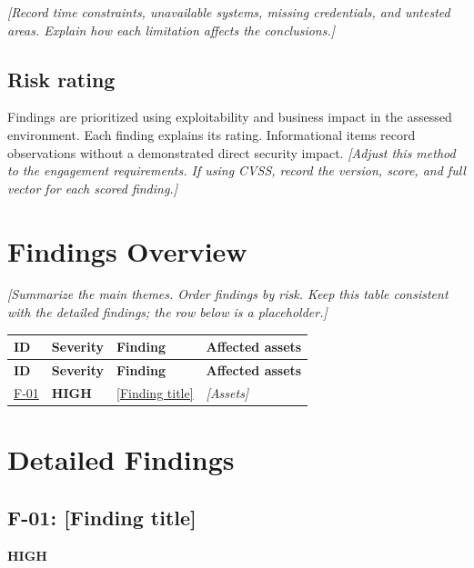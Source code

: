 \documentclass[11pt,letterpaper]{article}
\newcommand{\prompt}[1]{\textit{\textcolor{muted}{[#1]}}}
\newcommand{\severity}[1]{\textbf{\textcolor{#1}{\MakeUppercase{#1}}}}
\newcommand{\finding}[4]{%
  \clearpage
  \subsection{#1: #2}\label{#4}
  \severity{#3}\par
}
\begin{document}
\prompt{Record time constraints, unavailable systems, missing credentials,
and untested areas. Explain how each limitation affects the conclusions.}

\subsection{Risk rating}
Findings are prioritized using exploitability and business impact in the
assessed environment. Each finding explains its rating. Informational items
record observations without a demonstrated direct security impact.
\prompt{Adjust this method to the engagement requirements. If using CVSS,
record the version, score, and full vector for each scored finding.}

\clearpage
\section{Findings Overview}
\prompt{Summarize the main themes. Order findings by risk. Keep this table
consistent with the detailed findings; the row below is a placeholder.}

\begin{longtable}{@{}p{}p{}p{}p{}@{}}
  \toprule
  \textbf{ID} & \textbf{Severity} & \textbf{Finding} & \textbf{Affected assets} \\
  \midrule
  \endfirsthead
  \toprule
  \textbf{ID} & \textbf{Severity} & \textbf{Finding} & \textbf{Affected assets} \\
  \midrule
  \endhead
  \bottomrule
  \endfoot
  \hyperref[finding:01]{F-01} & \severity{high} &
  \hyperref[finding:01]{[Finding title]} & \prompt{Assets} \\
\end{longtable}

\clearpage
\section{Detailed Findings}
\begingroup
\let\clearpage\relax
\finding{F-01}{[Finding title]}{high}{finding:01}
\endgroup
\end{document}
